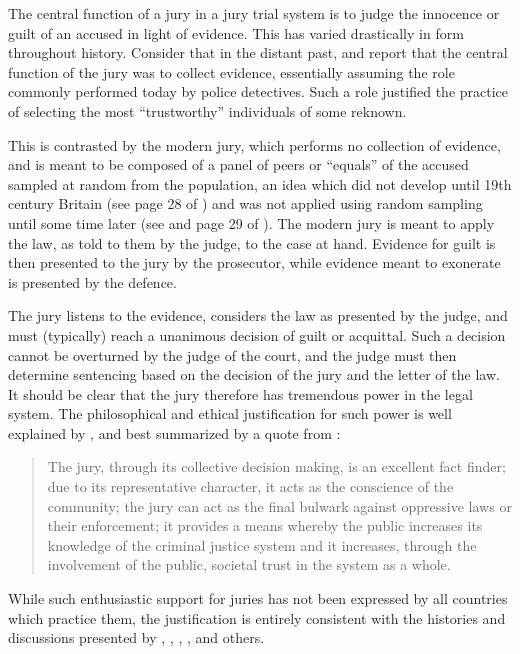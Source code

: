 The central function of a jury in a jury trial system is to judge the innocence or guilt of an accused in light of evidence. This
has varied drastically in form throughout history. Consider that in the distant past, \cite{vonmosch1921} and \cite{hoffman1997}
report that the central function of the jury was to collect evidence, essentially assuming the role commonly performed today by
police detectives. Such a role justified the practice of selecting the most ``trustworthy'' individuals of some reknown.

This is contrasted by the modern jury, which performs no collection of evidence, and is meant to be composed of a panel of peers
or ``equals'' of the accused sampled at random from the population, an idea which did not develop until 19th century Britain (see
page 28 of \cite{hansvidjudging}) and was not applied using random sampling until some time later (see \cite{hoffman1997} and page
29 of \cite{hansvidjudging}). The modern jury is meant to apply the law, as told to them by the judge, to the case at
hand. Evidence for guilt is then presented to the jury by the prosecutor, while evidence meant to exonerate is presented by the
defence.

The jury listens to the evidence, considers the law as presented by the judge, and must (typically) reach a unanimous
decision of guilt or acquittal. Such a decision cannot be overturned by the judge of the court, and the judge must then determine
sentencing based on the decision of the jury and the letter of the law. It should be clear that the jury therefore has tremendous
power in the legal system. The philosophical and ethical justification for such power is well explained by \cite{woolley2018}, and
best summarized by a quote from \cite{rvsherratt}:

\begin{quote}
  \centering
  The jury, through its collective decision making, is an excellent fact finder; due to its representative character, it acts as
  the conscience of the community; the jury can act as the final bulwark against oppressive laws or their enforcement; it provides
  a means whereby the public increases its knowledge of the criminal justice system and it increases, through the involvement of
  the public, societal trust in the system as a whole.
\end{quote}

While such enthusiastic support for juries has not been expressed by all countries which practice them, the justification is
entirely consistent with the histories and discussions presented by \cite{hoffman1997}, \cite{vonmosch1921}, \cite{hansvidjudging},
\cite{vandykejurysel}, and others.

